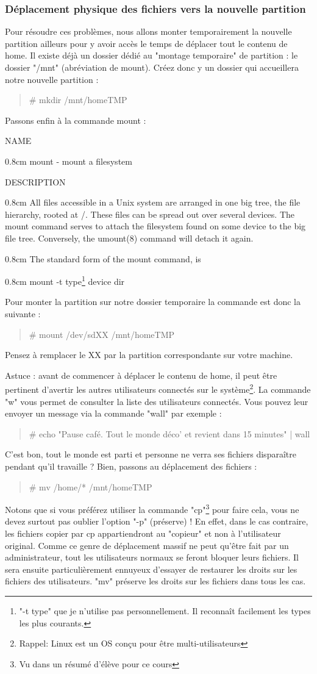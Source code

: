 \documentclass[a4paper,11pt]{article}
\newcommand{\commande}[1] {
    \begin{quote}
    \tt\raggedright #1
    \end{quote}
}
\newcommand{\man}[2]{
    \begin{tcolorbox}[toprule=3mm,width=\textwidth,outer arc=0mm,colbacktitle=grayman,coltitle=black,colback={grayman},colframe={grayman},title={man : \tt #1}]
        \tt\raggedright #2
    \end{tcolorbox}
}
\newcommand{\mandesc}[1]{
    \begin{adjustwidth}{0.8cm}{}
        #1
    \end{adjustwidth}
}
\begin{document}
\subsubsection{Déplacement physique des fichiers vers la nouvelle partition}
\par Pour résoudre ces problèmes, nous allons monter temporairement la nouvelle partition ailleurs pour y avoir accès le temps de déplacer tout le contenu de home. Il existe déjà un dossier dédié au "montage temporaire" de partition : le dossier "/mnt" (abréviation de mount). Créez donc y un dossier qui accueillera notre nouvelle partition :
\commande{\# mkdir /mnt/homeTMP}
\par Passons enfin à la commande mount :
\man{mount}{NAME
\mandesc{mount - mount a filesystem}
DESCRIPTION
\mandesc{All  files  accessible  in  a  Unix  system are arranged in one big tree, the file hierarchy, rooted at /.  These files can be spread out over several devices. The mount command serves to attach the filesystem found on some device to the big file tree. Conversely, the umount(8) command will detach it again.}
\mandesc{The standard form of the mount command, is
    \mandesc{mount -t type\footnote{"-t type" que je n'utilise pas personnellement. Il reconnaît facilement les types les plus courants.} device dir}
}}
\par Pour monter la partition sur notre dossier temporaire la commande est donc la suivante :
\commande{\# mount /dev/sdXX /mnt/homeTMP}
\par Pensez à remplacer le XX par la partition correspondante sur votre machine.
\par Astuce : avant de commencer à déplacer le contenu de home, il peut être pertinent d'avertir les autres utilisateurs connectés sur le système\footnote{Rappel: Linux est un OS conçu pour être multi-utilisateurs}. La commande "w" vous permet de consulter la liste des utilisateurs connectés. Vous pouvez leur envoyer un message via la commande "wall" par exemple :
\commande{\# echo "Pause café. Tout le monde déco' et revient dans 15 minutes" | wall}
\par C'est bon, tout le monde est parti et personne ne verra ses fichiers disparaître pendant qu'il travaille ? Bien, passons au déplacement des fichiers :
\commande{\# mv /home/* /mnt/homeTMP}
\par Notons que si vous préférez utiliser la commande "cp"\footnote{Vu dans un résumé d'élève pour ce cours} pour faire cela, vous ne devez surtout pas oublier l'option "-p" (préserve) ! En effet, dans le cas contraire, les fichiers copier par cp appartiendront au "copieur" et non à l'utilisateur original. Comme ce genre de déplacement massif ne peut qu'être fait par un administrateur, tout les utilisateurs normaux se feront bloquer leurs fichiers. Il sera ensuite particulièrement ennuyeux d'essayer de restaurer les droits sur les fichiers des utilisateurs. "mv" préserve les droits sur les fichiers dans tous les cas.
\end{document}
